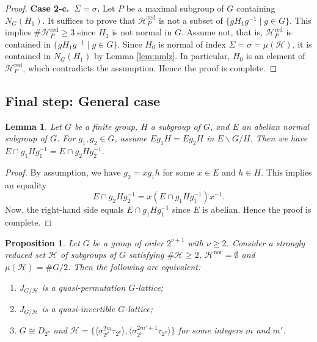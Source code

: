 \documentclass[12pt]{amsart}
\theoremstyle{plain}
\newtheorem{prop}[thm]{Proposition}
\newtheorem{lem}[thm]{Lemma}
\theoremstyle{definition}
\numberwithin{thm}{section}
\numberwithin{equation}{section}
\newcommand{\cH}{\mathcal{H}}
\DeclareMathOperator{\red}{red}
\DeclareMathOperator{\nor}{nor}
\begin{document}
\begin{proof}
\textbf{Case 2-c.~$\Sigma=\sigma$. }
Let $P$ be a maximal subgroup of $G$ containing $N_{G}(H_{1})$. It suffices to prove that $\cH_{P}^{\red}$ is not a subset of $\{gH_{1}g^{-1}\mid g\in G\}$. This implies $\#\cH_{P}^{\red}\geq 3$ since $H_{1}$ is not normal in $G$. Assume not, that is, $\cH_{P}^{\red}$ is contained in $\{gH_{1}g^{-1}\mid g\in G\}$. Since $H_{0}$ is normal of index $\Sigma=\sigma=\mu(\cH)$, it is contained in $N_{G}(H_{1})$ by Lemma \ref{lem:nmlz}. In particular, $H_{0}$ is an element of $\cH_{P}^{\red}$, which contradicts the assumption. Hence the proof is complete. 
\end{proof}

\subsection{Final step: General case}

\begin{lem}\label{lem:abcj}
Let $G$ be a finite group, $H$ a subgroup of $G$, and $E$ an abelian normal subgroup of $G$. For $g_{1},g_{2}\in G$, assume $Eg_{1}H=Eg_{2}H$ in $E\backslash G/H$. Then we have $E\cap g_{1}Hg_{1}^{-1}=E\cap g_{2}Hg_{2}^{-1}$. 
\end{lem}

\begin{proof}
By assumption, we have $g_{2}=xg_{1}h$ for some $x\in E$ and $h\in H$. This implies an equality
\begin{equation*}
E\cap g_{2}Hg_{2}^{-1}=x(E\cap g_{1}Hg_{1}^{-1})x^{-1}. 
\end{equation*}
Now, the right-hand side equals $E\cap g_{1}Hg_{1}^{-1}$ since $E$ is abelian. Hence the proof is complete. 
\end{proof}

\begin{prop}\label{prop:mxmu}
Let $G$ be a group of order $2^{\nu+1}$ with $\nu \geq 2$. Consider a strongly reduced set $\cH$ of subgroups of $G$ satisfying $\#\cH \geq 2$, $\cH^{\nor}=\emptyset$ and $\mu(\cH)=\#G/2$. Then the following are equivalent: 
\begin{enumerate}
\item $J_{G/\cH}$ is a quasi-permutation $G$-lattice; 
\item $J_{G/\cH}$ is a quasi-invertible $G$-lattice; 
\item $G \cong D_{2^{\nu}}$ and $\cH=\{\langle \sigma_{2^{\nu}}^{2m}\tau_{2^{\nu}} \rangle, \langle \sigma_{2^{\nu}}^{2m'+1}\tau_{2^{\nu}} \rangle\}$ for some integers $m$ and $m'$. 
\end{enumerate}
\end{prop}
\end{document}
